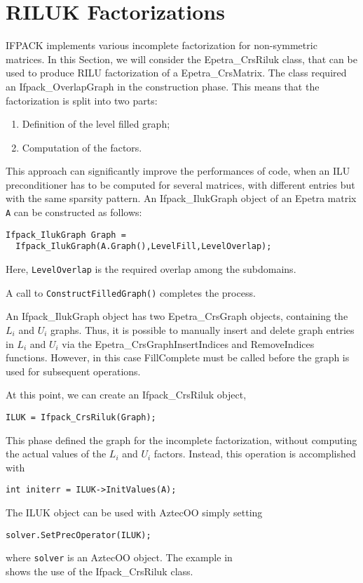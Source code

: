
\section{RILUK  Factorizations}
\label{sec:ifpack_rilu}

IFPACK implements various incomplete factorization for non-symmetric
matrices. In this Section, we will consider the Epetra\_CrsRiluk class,
that can be used to produce RILU factorization of a Epetra\_CrsMatrix.
The class required an Ifpack\_OverlapGraph in the construction phase.
This means that the factorization is split into two parts:
\begin{enumerate}
\item Definition of the level filled graph;
\item Computation of the factors.
\end{enumerate}
This approach can significantly improve the performances of code, when
an ILU preconditioner has to be computed for several matrices, with
different entries but with the same sparsity pattern. An
Ifpack\_IlukGraph object of an Epetra matrix \verb!A! can be constructed
as follows:
\begin{verbatim}
Ifpack_IlukGraph Graph = 
  Ifpack_IlukGraph(A.Graph(),LevelFill,LevelOverlap);
\end{verbatim}
Here, \verb!LevelOverlap! is the required overlap among the subdomains.

A call to \verb!ConstructFilledGraph()! completes the process.

\begin{remark}
  An Ifpack\_IlukGraph object has two Epetra\_CrsGraph objects,
  containing the $L_i$ and $U_i$ graphs. Thus, it is possible to
  manually insert and delete graph entries in $L_i$ and $U_i$ via the
  Epetra\_CrsGraphInsertIndices and RemoveIndices functions. However, in
  this case FillComplete must be called before the graph is used for
  subsequent operations.
\end{remark}

At this point, we can create an Ifpack\_CrsRiluk object,
\begin{verbatim}
ILUK = Ifpack_CrsRiluk(Graph);
\end{verbatim}
This phase defined the graph for the incomplete factorization, without
computing the actual values of the $L_i$ and $U_i$ factors. Instead,
this operation is accomplished with
\begin{verbatim}
int initerr = ILUK->InitValues(A);
\end{verbatim}
The ILUK object can be used with AztecOO simply setting
\begin{verbatim}
solver.SetPrecOperator(ILUK);
\end{verbatim}
where \verb!solver! is an AztecOO object.
\smallskip
The example in \\  shows the use of the Ifpack\_CrsRiluk class.

